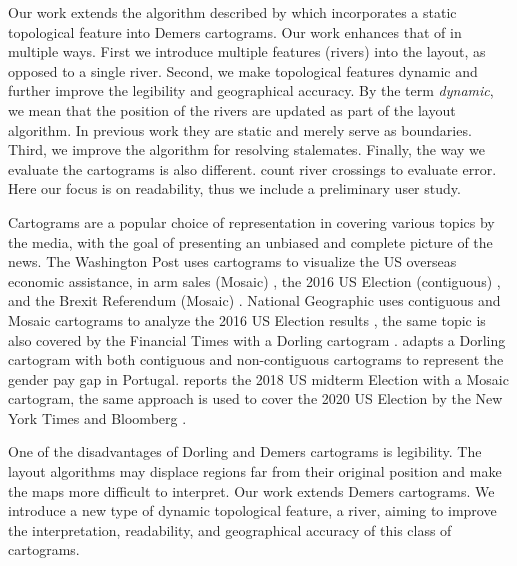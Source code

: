 Our work extends the algorithm described by  which incorporates a static topological feature into Demers cartograms. Our work enhances that of \citeauthor{tong2018cartograms} in multiple ways. First we introduce multiple features (rivers) into the layout, as opposed to a single river. Second, we make topological features dynamic and further improve the legibility and geographical accuracy. By the term \textit{dynamic}, we mean that the position of the rivers are updated as part of the layout algorithm. In previous work they are static and merely serve as boundaries. Third, we improve the algorithm for resolving stalemates. Finally, the way we evaluate the cartograms is also different. \citeauthor{tong2018cartograms} count river crossings to evaluate error. Here our focus is on readability, thus we include a preliminary user study.

Cartograms are a popular choice of representation in covering various topics by the media, with the goal of presenting an unbiased and complete picture of the news. The Washington Post uses cartograms to visualize the US overseas economic assistance, in arm sales (Mosaic) \cite{bearak2016Everything}, the 2016 US Election (contiguous) \cite{gamio2016Election}, and the Brexit Referendum (Mosaic) \cite{taylor2016What}. National Geographic uses contiguous and Mosaic cartograms to analyze the 2016 US Election results \cite{miller2016Election}, the same topic is also covered by the Financial Times with a Dorling cartogram \cite{stabe2016Search}.  adapts a Dorling cartogram with both contiguous and non-contiguous cartograms to represent the gender pay gap in Portugal.  reports the 2018 US midterm Election with a Mosaic cartogram, the same approach is used to cover the 2020 US Election by the New York Times \cite{thelearningnetwork2020What} and Bloomberg \cite{mccartney20202020}.




One of the disadvantages of Dorling and Demers cartograms is legibility. The layout algorithms may displace regions far from their original position and make the maps more difficult to interpret. Our work extends Demers cartograms. We introduce a new type of dynamic topological feature, a river, aiming to improve the interpretation, readability, and geographical accuracy of this class of cartograms.